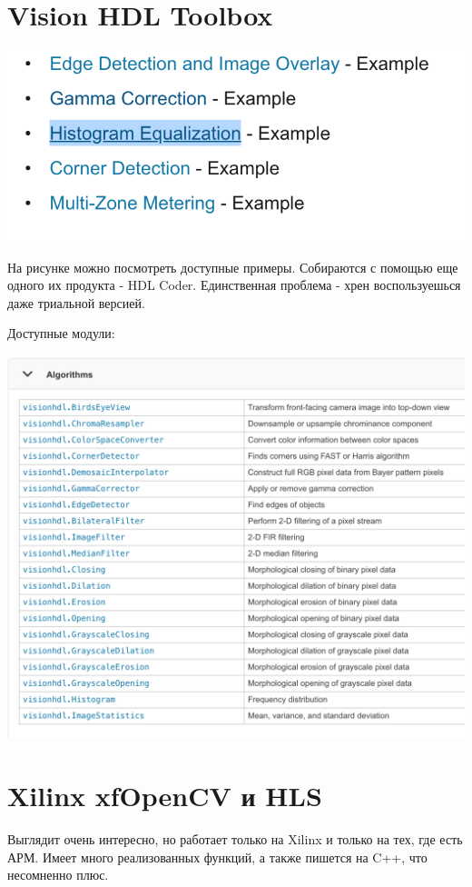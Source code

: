 \documentclass[12pt]{article}
\begin{document}
\section{Vision HDL Toolbox}

\includegraphics[scale=0.25]{../img/vision_hdl_examples.png}

На рисунке можно посмотреть доступные примеры. Собираются с помощью
еще одного их продукта - HDL Coder. Единственная проблема - хрен воспользуешься
даже триальной версией.

Доступные модули:

\includegraphics[scale=0.25]{../img/vision_hdl_ip_cores.png}


\section{Xilinx xfOpenCV и HLS}

Выглядит очень интересно, но работает только на Xilinx и только на тех, 
где есть АРМ. Имеет много реализованных функций, а также пишется на C++, 
что несомненно плюс.
\end{document}
